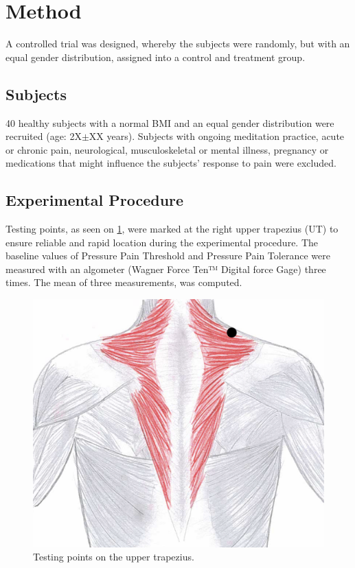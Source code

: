 \section{Method}
A controlled trial was designed, whereby the subjects were randomly, but with an equal gender distribution, assigned into a control and treatment group.
\subsection{Subjects}
40 healthy subjects with a normal BMI and an equal gender distribution were recruited (age: 2X$\pm$XX years). 
Subjects with ongoing meditation practice, acute or chronic pain, neurological, musculoskeletal or mental illness, pregnancy or medications that might influence the subjects’ response to pain were excluded.

\subsection{Experimental Procedure}
Testing points, as seen on \ref{fig:trapezius}, were marked at the right upper trapezius (UT) to ensure reliable and rapid location during the experimental procedure. The baseline values of Pressure Pain Threshold and Pressure Pain Tolerance were measured with an algometer (Wagner Force Ten™ Digital force Gage) three times.  The mean of three measurements, was computed. 

\begin{figure}[H]
\centering
\includegraphics[width=.7\columnwidth]{../figures/trapezius}
\caption{Testing points on the upper trapezius.}
\label{fig:trapezius}
\end{figure} \vspace{-.5cm}

